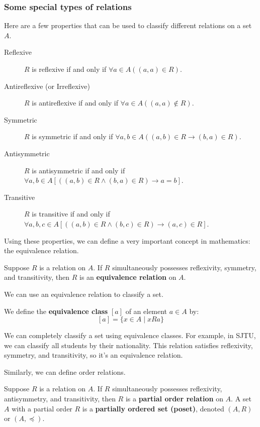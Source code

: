 \documentclass[oneside]{book}
\begin{document}
\subsubsection{Some special types of relations}
Here are a few properties that can be used to classify different relations on a set $A$.
\begin{description}
    \item[Reflexive] $R$ is reflexive if and only if $\forall a \in A ((a,a) \in R)$.
    \item[Antireflexive (or Irreflexive)] $R$ is antireflexive if and only if $\forall a \in A ((a,a) \notin R)$.
    \item[Symmetric] $R$ is symmetric if and only if $\forall a,b \in A ((a,b) \in R \to (b,a) \in R)$.
    \item[Antisymmetric] $R$ is antisymmetric if and only if $\forall a,b \in A [((a,b) \in R \wedge (b,a) \in R) \to a = b]$.
    \item[Transitive] $R$ is transitive if and only if $\forall a,b,c \in A [((a,b) \in R \wedge (b,c) \in R) \to (a,c) \in R]$.
\end{description}
Using these properties, we can define a very important concept in mathematics: the equivalence relation.

\begin{definition}
Suppose $R$ is a relation on $A$. If $R$ simultaneously possesses reflexivity, symmetry, and transitivity, then $R$ is an \textbf{equivalence relation} on $A$.
\end{definition}

We can use an equivalence relation to classify a set.
\begin{definition}
We define the \textbf{equivalence class} $[a]$ of an element $a \in A$ by:
$$ [a] = \{ x \in A \mid xRa \} $$
\end{definition}
We can completely classify a set using equivalence classes. For example, in SJTU, we can classify all students by their nationality. This relation satisfies reflexivity, symmetry, and transitivity, so it’s an equivalence relation.

Similarly, we can define order relations.
\begin{definition}
Suppose $R$ is a relation on $A$. If $R$ simultaneously possesses reflexivity, antisymmetry, and transitivity, then $R$ is a \textbf{partial order relation} on $A$. A set $A$ with a partial order $R$ is a \textbf{partially ordered set (poset)}, denoted $(A, R)$ or $(A, \preceq)$.
\end{definition}
\end{document}
